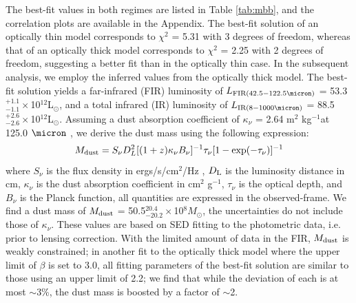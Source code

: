 \documentclass[twocolumn,apj,numberedappendix]{emulateapj}
\newcommand{\Msun}{\mbox{$M_{\odot}$}}
\newcommand{\Lsun}{\mbox{L$_{\odot}$}}
\newcommand{\pmOne}{$^{-1}$}
\begin{document}

The best-fit values in both regimes are listed in Table \ref{tab:mbb}, and the correlation plots are available in the Appendix. The best-fit solution of an optically thin
model corresponds to $\chi^2$ = 5.31 with 3 degrees of freedom, whereas that of an optically thick model
corresponds to $\chi^2$ = 2.25 with 2 degrees of freedom, suggesting a better fit than in the optically thin
case. In the subsequent analysis, we employ the inferred values from the optically thick model.
The best-fit solution yields a far-infrared (FIR) luminosity of $L_{\rm FIR (42.5-122.5\micron)}$ = 53.3$^{+1.1}_{-1.1}\times$10$^{12}$\Lsun, and a total infrared (IR) luminosity of $L_{\rm IR (8-1000 \micron)}$ = 88.5$^{+2.6}_{-2.6}\times$10$
^{12}$\Lsun. Assuming a dust absorption coefficient of $\kappa_{\nu}$ = 2.64 m$^2$ kg\pmOne at 125.0 $
\micron$ \citep{Dunne03a}, we derive the dust mass using the following expression:
\begin{equation}
M_{\rm dust} = S_{\nu} D_{L}^2 [(1 + z) \kappa_{\nu} B_{\nu}]^{-1} \tau_{\nu} [1-
\exp(-\tau_{\nu})]^{-1}
\end{equation}
where $S_{\nu}$ is the flux density in ergs/s/cm$^{2}$/Hz , $D_{\rm L}$ is the luminosity distance in cm, $\kappa_{\nu}$ is the dust
absorption coefficient in cm$^2$ g\pmOne, $\tau_{\nu}$ is the optical depth, and $B_{\nu}$ is the Planck function,
all quantities are expressed in the observed-frame. We find a dust mass of $M_{\rm dust}$ =
50.5$^{20.4}_{-20.2}\times$10$^8$\Msun, the uncertainties do not include those of $\kappa_{\nu}$. These values are based on SED fitting to the photometric data, i.e. prior
to lensing correction. With the limited amount of data in the FIR, $M_{\rm dust}$ is weakly constrained; in another fit to the optically thick model where the upper limit of $\beta$ is set to 3.0, all fitting parameters of the best-fit solution are similar to those using an upper limit of 2.2; we find that while the deviation of each is at most $\sim$3\%, the dust mass is boosted by a factor of $\sim$2. 
\end{document}
